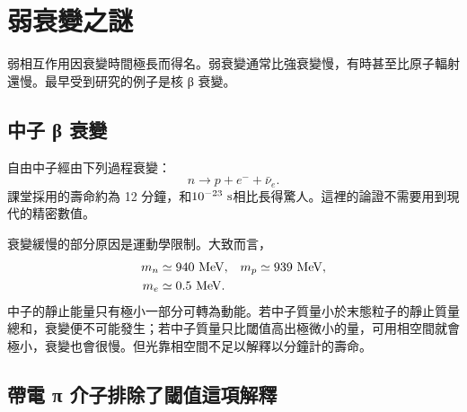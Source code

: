 \begin{classroomqa}
\end{classroomqa}

\begin{classroomqa}
\end{classroomqa}

\section{弱衰變之謎}

弱相互作用因衰變時間極長而得名。弱衰變通常比強衰變慢，有時甚至比原子輻射還慢。最早受到研究的例子是核 {\proseunicodefont β} 衰變。

\subsection{中子 {\proseunicodefont β} 衰變}

自由中子經由下列過程衰變：
\begin{equation}
n\longrightarrow p+e^-+\bar\nu_e.
\label{eq:l5-neutron-decay-intro}
\end{equation}
課堂採用的壽命約為 12 分鐘，和\(10^{-23}\ {\rm s}\)相比長得驚人。這裡的論證不需要用到現代的精密數值。

衰變緩慢的部分原因是運動學限制。大致而言，
\begin{equation}
\begin{aligned}
m_n&\simeq940\ {\rm MeV},
&
m_p&\simeq939\ {\rm MeV},
\\
m_e&\simeq0.5\ {\rm MeV}.
\end{aligned}
\end{equation}
中子的靜止能量只有極小一部分可轉為動能。若中子質量小於末態粒子的靜止質量總和，衰變便不可能發生；若中子質量只比閾值高出極微小的量，可用相空間就會極小，衰變也會很慢。但光靠相空間不足以解釋以分鐘計的壽命。

\subsection{帶電 {\proseunicodefont π} 介子排除了閾值這項解釋}

